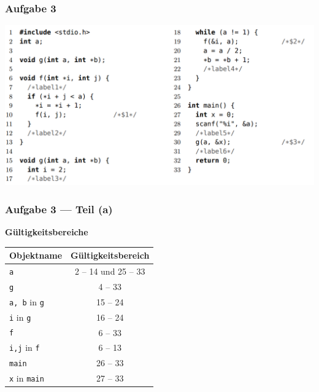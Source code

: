 \documentclass{beamer}
\begin{document}
\begin{frame} \frametitle{Aufgabe 3}
	\centering
	\includegraphics[width=\textwidth]{./tut05_aufgabe3.png}
\end{frame}

\begin{frame} \frametitle{Aufgabe 3 --- Teil (a)}
	\textbf{Gültigkeitsbereiche}

	\centering
	\begin{tabular}{|l|c|}
		\hline
		Objektname & Gültigkeitsbereich \\ \hline \hline
		\texttt{a} & 2 -- 14 und 25 -- 33 \\ \hline
		\texttt{g} & 4 -- 33 \\ \hline
		\texttt{a, b} in \texttt{g} & 15 -- 24 \\ \hline
		\texttt{i} in \texttt{g} & 16 -- 24 \\ \hline
		\texttt{f} & 6 -- 33 \\ \hline
		\texttt{i,j} in \texttt{f} & 6 -- 13 \\ \hline
		\texttt{main} & 26 -- 33 \\ \hline
		\texttt{x} in \texttt{main} & 27 -- 33 \\ \hline
	\end{tabular}
\end{frame}
\end{document}
